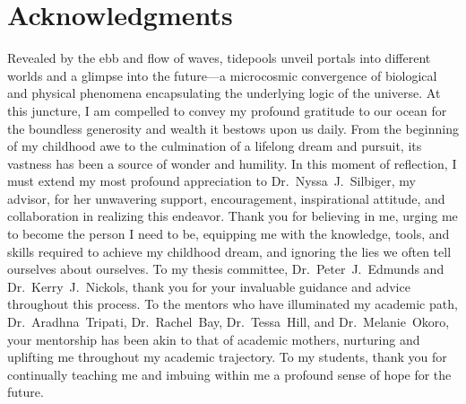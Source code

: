 \documentclass{CSUNthesis}
\begin{document}


\cleardoublepage
{}
{}
\chapter*{Acknowledgments}
\pagestyle{plain}

\begin{spacing}{1.5}
  \justifying
  \indent Revealed by the ebb and flow of waves, tidepools unveil portals into different worlds and a glimpse into the future—a microcosmic convergence of biological and physical phenomena encapsulating the underlying logic of the universe. At this juncture, I am compelled to convey my profound gratitude to our ocean for the boundless generosity and wealth it bestows upon us daily. From the beginning of my childhood awe to the culmination of a lifelong dream and pursuit, its vastness has been a source of wonder and humility. In this moment of reflection, I must extend my most profound appreciation to Dr.~Nyssa~J.~Silbiger, my advisor, for her unwavering support, encouragement, inspirational attitude, and collaboration in realizing this endeavor. Thank you for believing in me, urging me to become the person I need to be, equipping me with the knowledge, tools, and skills required to achieve my childhood dream, and ignoring the lies we often tell ourselves about ourselves. To my thesis committee, Dr.~Peter~J.~Edmunds and Dr.~Kerry~J.~Nickols, thank you for your invaluable guidance and advice throughout this process. To the mentors who have illuminated my academic path, Dr.~Aradhna~Tripati, Dr.~Rachel~Bay, Dr.~Tessa~Hill, and Dr.~Melanie~Okoro, your mentorship has been akin to that of academic mothers, nurturing and uplifting me throughout my academic trajectory. To my students, thank you for continually teaching me and imbuing within me a profound sense of hope for the future. 

\end{spacing}
\end{document}
